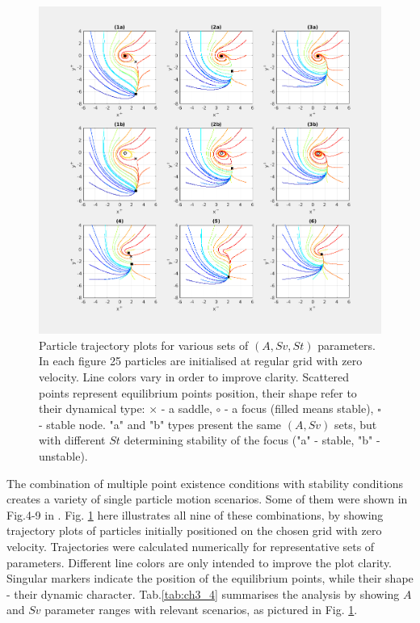 \documentclass[../main.tex]{subfiles}
\begin{document}
\begin{figure}
\centering
\noindent \includegraphics[width=30pc]{gfx/scenarios_9p_T500_D5_N5.png}
\caption{Particle trajectory plots for various sets of $(A,Sv,St)$ parameters. In each figure 25 particles are initialised at regular grid with zero velocity. Line colors vary in order to improve clarity. Scattered points represent equilibrium points position, their shape refer to their dynamical type: $\times$ - a saddle, $\circ$ - a focus (filled means stable), $\square$ - stable node. "a" and "b" types present the same $(A,Sv)$ sets, but with different $St$ determining stability of the focus ("a" - stable, "b" - unstable).}
\label{fig:ch3_9}
\end{figure}

The combination of multiple point existence conditions with stability conditions creates a variety of single particle motion scenarios. Some of them were shown in Fig.4-9 in \citet{Marcu1995}. Fig. \ref{fig:ch3_9} here illustrates all nine of these combinations, by showing trajectory plots of particles initially positioned on the chosen grid with zero velocity. Trajectories were calculated numerically for representative sets of parameters. Different line colors are only intended to improve the plot clarity. Singular markers indicate the position of the equilibrium points, while their shape - their dynamic character. Tab.\ref{tab:ch3_4} summarises the analysis by showing $A$ and $Sv$ parameter ranges with relevant scenarios, as pictured in Fig. \ref{fig:ch3_9}.
\end{document}
